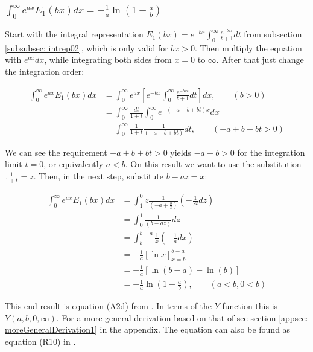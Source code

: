 \documentclass[bibliography=totocnumbered]{scrartcl}
\newcommand{\assume}[1][\text{MISSING PARAMETER}]{,\qquad\left(#1\right)}
\begin{document}
	\subsubsection[A integral of E1(x), involving the exponential function]{$\int_{0}^{\infty}e^{ax}E_1\left(bx\right)dx=-\frac{1}{a}\ln\left(1-\frac{a}{b}\right)$}
	\label{subsubsec: generalIntegralOfE3}

	Start with the integral representation $E_1\left(bx\right)=e^{-bx}\int_{0}^{\infty}\frac{e^{-bxt}}{t+1}dt$ from subsection \ref{subsubsec: intrep02}, which is only valid for $bx>0$. Then multiply the equation with $e^{ax}dx$, while integrating both sides from $x=0$ to $\infty$. After that just change the integration order:

	\begin{align}
		\int_{0}^{\infty}e^{ax}E_1\left(bx\right)dx&=\int_{0}^{\infty}e^{ax}\left[e^{-bx}\int_{0}^{\infty}\frac{e^{-bxt}}{t+1}dt\right]dx\assume[b>0]\\
		&=\int_{0}^{\infty}\frac{dt}{1+t}\int_{0}^{\infty}e^{-\left(-a+b+bt\right)x}dx\\
		&=\int_{0}^{\infty}\frac{1}{1+t}\frac{1}{\left(-a+b+bt\right)}dt\assume[-a+b+bt>0]
	\end{align}

	We can see the requirement $-a+b+bt>0$ yields $-a+b>0$ for the integration limit $t=0$, or equivalently $a<b$. On this result we want to use the substitution $\frac{1}{1+t}=z$. Then, in the next step, substitute $b-az=x$:

	\begin{align}
		\int_{0}^{\infty}e^{ax}E_1\left(bx\right)dx&=\int_{1}^{0}z\frac{1}{\left(-a+\frac{b}{z}\right)}\left(-\frac{1}{z^2}dz\right)\\
		&=\int_{0}^{1}\frac{1}{\left(b-az\right)}dz\\
		&=\int_{b}^{b-a}\frac{1}{x}\left(-\frac{1}{a}dx\right)\\
		&=-\frac{1}{a}\left[\ln{x}\right]^{b-a}_{x=b}\\
		&=-\frac{1}{a}\left[\ln{\left(b-a\right)}-\ln{\left(b\right)}\right]\\
		&=-\frac{1}{a}\ln{\left(1-\frac{a}{b}\right)}\assume[a<b, 0<b]\label{eq: generalIntegralOfE3}
	\end{align}

	This end result is equation (A2d) from \cite{boer1990calc}. In terms of the $Y$-function this is $Y\left(a,b,0,\infty\right)$. For a more general derivation based on that of \autocite[73\psq]{schloemilch} see section \ref{appsec: moreGeneralDerivation1} in the appendix. The equation can also be found as equation (R10) in \cite{sherman}.
\end{document}
